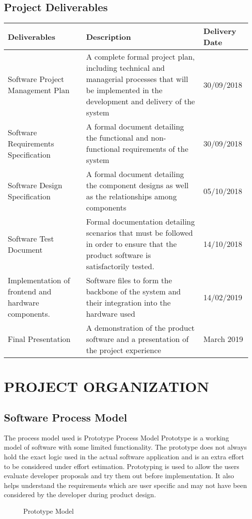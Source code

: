 \documentclass[10pt]{article}
\begin{document}
\newpage
\subsection{Project Deliverables}
\begin{center}
\begin{tabular} { | m{3.5cm} | m{6.5cm} |  m{2.5cm} | }
	\hline 
	\textbf{Deliverables}  & \textbf{Description} & \textbf{Delivery Date}\\ 
	\hline 
	Software Project Management Plan   & A complete formal project plan, including technical and managerial processes that will be implemented in the development and delivery of the system & 30/09/2018 \\
	\hline 
		Software Requirements Specification   & A formal document detailing the functional and non-functional requirements of the system & 30/09/2018 \\
	\hline 
		Software Design Specification  & A formal document detailing the component designs as well as the relationships among components & 05/10/2018 \\
	\hline 
		Software Test Document  & Formal documentation detailing scenarios that must be followed in order to ensure that the product software is satisfactorily tested. & 14/10/2018 \\
	\hline 
		Implementation of frontend and hardware components.  & Software files to form the backbone of the system and their integration into the hardware used & 14/02/2019 \\
	\hline 
		Final Presentation  & A demonstration of the product software and a presentation of the project experience & March 2019 \\
	\hline 
\end{tabular}
\end{center}

\newpage
\section{PROJECT ORGANIZATION}
\subsection{Software Process Model}
The process model used is Prototype Process Model 
Prototype is a working model of software with some limited functionality. The prototype does not always hold the exact logic used in the actual software application and is an extra effort to be considered under effort estimation.
Prototyping is used to allow the users evaluate developer proposals and try them out before implementation. It also helps understand the requirements which are user specific and may not have been considered by the developer during product design.
\begin{figure}[h!]
	\caption{Prototype Model}
\end{figure}
\end{document}
